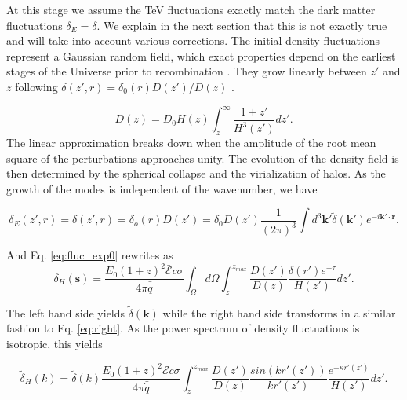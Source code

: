 \documentclass[twocolumns]{emulateapj}
\begin{document}
{%

At this stage we assume the TeV fluctuations exactly match the dark matter fluctuations $\delta_E=\delta$.  We explain in the next section that this is not exactly true and will take into account various corrections.  The initial density fluctuations represent a Gaussian random field, which exact properties depend on the earliest stages of the Universe prior to recombination \citep{1986ApJ...304...15B,Peebles}. They grow linearly between $z'$ and $z$ following $\delta(z',r)=\delta_0(r)D(z')/D(z)$ \citep{ 1977MNRAS.179..351H}.

\begin{equation}
  \label{eq:growth_1}
  D(z)=D_0H(z)\int_z^{\infty}\frac{1+z'}{H^3(z')}dz'.
\end{equation}
The linear approximation breaks down when the amplitude of the root mean square of the perturbations approaches unity. The evolution of the density field is then determined by the spherical collapse \citep{1972ApJ...176....1G} and the virialization of halos. As the growth of the modes is independent of the wavenumber, we have

\begin{equation}
  \label{eq:FT_delta}
  \delta_E(z',r)=\delta(z',r)=\delta_o(r)D(z')=\delta_0D(z')\frac{1}{(2\pi)^3}\int d^3\mathbf{k'} \tilde{\delta}(\mathbf{k'}) e^{-i\mathbf{k'}\cdot\mathbf{r}}.
\end{equation}


And Eq. \ref{eq:fluc_exp0}  rewrites as
\begin{equation}
  \label{eq:heat_fluc_exp0}
  \delta_H(\mathbf{s})=\frac{ E_0(1+z)^2 \bar{\mathcal{E}} c\sigma}{4\pi\bar{\dot{q}}} \int_{\Omega}d\Omega\int_z^{z_{max}}  \frac{D(z')}{D(z)} \frac{\delta(r') e^{-\tau}}{H(z')}dz'.
\end{equation}


The left hand side yields $\tilde{\delta}(\mathbf{k})$ while the right hand side transforms in a similar fashion to Eq. \ref{eq:right}. As the power spectrum of density fluctuations is isotropic, this  yields

\begin{equation}
  \label{eq:heat_fluc_exp1}
  \tilde{\delta}_H(k)=\tilde{\delta}(k) \frac{E_0(1+z)^2\bar{\mathcal{E}}c\sigma}{4\pi\bar{\dot{q}}} \int_z^{z_{max}} \frac{D(z')}{D(z)}\frac{sin(kr'(z'))}{kr'(z')}    \frac{e^{-\kappa r'(z')}} {H(z')}  dz'.
\end{equation}

}
\end{document}
